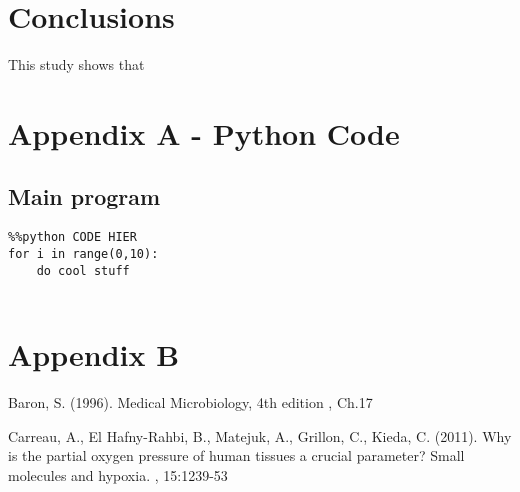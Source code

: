 \documentclass[twoside]{article}
\begin{document}
\section{Conclusions}
This study shows that 
\clearpage

\section{Appendix A - Python Code}\vspace{1em}
\subsection{Main program}
\begin{lstlisting}
%%python CODE HIER
for i in range(0,10):
	do cool stuff
	
\end{lstlisting}\vspace{1em}\clearpage


\section{Appendix B}


\clearpage

\begin{thebibliography}{1}
Baron, S. (1996).
\newblock Medical Microbiology, 4th edition
, Ch.17

Carreau, A., El Hafny-Rahbi, B., Matejuk, A., Grillon, C., Kieda, C. (2011).
\newblock Why is the partial oxygen pressure of human tissues a crucial parameter? Small molecules and hypoxia.
, 15:1239-53
\end{thebibliography}
\end{document}
